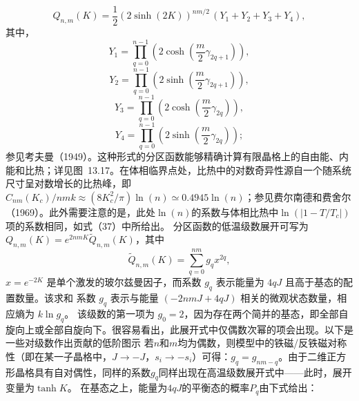 \begin{equation}\tag{13.4.4}\label{eq:13.4.4}
Q _ { n , m } ( K ) = \frac { 1 } { 2 } ( 2 \sinh ( 2 K ) ) ^{n m / 2} \, ( Y _ { 1 } + Y _ { 2 } + Y _ { 3 } + Y _ { 4 } ) ,
\end{equation}
其中，
\begin{equation}\tag{13.4.5}\label{eq:13.4.5}
Y _ { 1 } = \prod _ { q = 0 } ^{n - 1} \left( 2 \cosh \left( \frac { m } { 2 } \gamma _ { 2 q + 1 } \right) \right) ,
\end{equation}
\begin{equation}\tag{13.4.6}\label{eq:13.4.6}
Y _ { 2 } = \prod _ { q = 0 } ^{n - 1} \left( 2 \sinh \left( \frac { m } { 2 } \gamma _ { 2 q + 1 } \right) \right) ,
\end{equation}
\begin{equation}\tag{13.4.7}\label{eq:13.4.7}
Y _ { 3 } = \prod _ { q = 0 } ^{n - 1} \left( 2 \cosh \left( \frac { m } { 2 } \gamma _ { 2 q } \right) \right) ,
\end{equation}
\begin{equation}\tag{13.4.8}\label{eq:13.4.8}
Y _ { 4 } = \prod _ { q = 0 } ^{n - 1} \left( 2 \sinh \left( \frac { m } { 2 } \gamma _ { 2 q } \right) \right) ;
\end{equation}
参见考夫曼（1949）。这种形式的分区函数能够精确计算有限晶格上的自由能、内能和比热；详见图~13.17。在体相临界点处，比热中的对数奇异性源自一个随系统尺寸呈对数增长的比热峰，即 \(C_{nm}(K_{c})/nmk\approx(8K_{c}^{2}/\pi)\ln(n)\simeq0.4945\ln(n)\)；参见费尔南德和费舍尔（1969）。此外需要注意的是，此处\(\ln(n)\)的系数与体相比热中\(\ln(|1-T/T_{c}|)\)项的系数相同，如式（37）中所给出。
分区函数的低温级数展开可写为 \(Q_{n,m}(K)=e^{2nmK}\tilde{Q}_{n,m}(K)\)，其中
\begin{equation}\tag{13.4.9}\label{eq:13.4.9}
\tilde { Q } _ { n , m } ( K ) = \sum _ { q = 0 } ^{n m} g _ { q } x ^{2 q} ,
\end{equation}
\(x=e^{-2K}\) 是单个激发的玻尔兹曼因子，而系数 \(g_{q}\) 表示能量为 \(4qJ\) 且高于基态的配置数量。该求和
系数 \(g_{q}\) 表示与能量 \((-2nmJ + 4qJ)\) 相关的微观状态数量，相应熵为 \(k\ln g_{q}\)。
该级数的第一项为 \(g_{0}=2\)，因为存在两个简并的基态，即全部自旋向上或全部自旋向下。很容易看出，此展开式中仅偶数次幂的项会出现。以下是一些对级数作出贡献的低阶图示
若\(n\)和\(m\)均为偶数，则模型中的铁磁/反铁磁对称性（即在某一子晶格中，\(J \rightarrow -J\)，\(s_i \rightarrow -s_i\)）可得：\(g_q = g_{nm-q}\)。由于二维正方形晶格具有自对偶性，同样的系数\(g_q\)同样出现在高温级数展开式中——此时，展开变量为\(\tanh K\)。
在基态之上，能量为\(4qJ\)的平衡态的概率\(P_{q}\)由下式给出：

